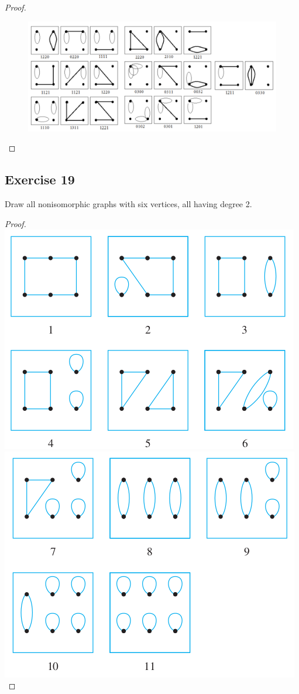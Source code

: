\documentclass[14pt]{extarticle}
\begin{document}
\begin{proof}
\begin{figure}[ht!]
\centering
\includegraphics[scale=0.38]{../images/10.3.18.png}
\end{figure}
\end{proof}

\subsection{Exercise 19}
Draw all nonisomorphic graphs with six vertices, all having degree 2.

\begin{proof}
\includegraphics[scale=0.4]{../images/10.3.19.a.png}
\includegraphics[scale=0.4]{../images/10.3.19.b.png}
\end{proof}
\end{document}
